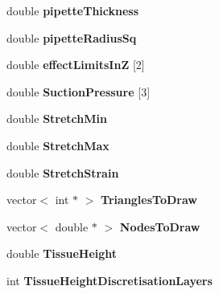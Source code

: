 \begin{DoxyCompactItemize}
\item 
\hypertarget{classSimulation_a330bde4b57359e57318c1105edde06c5}{}double {\bfseries pipette\+Thickness}\label{classSimulation_a330bde4b57359e57318c1105edde06c5}

\item 
\hypertarget{classSimulation_aee6fb6bd1bbed560039880b174a3a43c}{}double {\bfseries pipette\+Radius\+Sq}\label{classSimulation_aee6fb6bd1bbed560039880b174a3a43c}

\item 
\hypertarget{classSimulation_a70a94dce9bdc0a99a99cab0abe805185}{}double {\bfseries effect\+Limits\+In\+Z} \mbox{[}2\mbox{]}\label{classSimulation_a70a94dce9bdc0a99a99cab0abe805185}

\item 
\hypertarget{classSimulation_aa7b121f145af33dae88b463490aef709}{}double {\bfseries Suction\+Pressure} \mbox{[}3\mbox{]}\label{classSimulation_aa7b121f145af33dae88b463490aef709}

\item 
\hypertarget{classSimulation_a579d17e790d3ea2e470db00e3a732e0c}{}double {\bfseries Stretch\+Min}\label{classSimulation_a579d17e790d3ea2e470db00e3a732e0c}

\item 
\hypertarget{classSimulation_a53227db1a41449ba235979fdd052f42e}{}double {\bfseries Stretch\+Max}\label{classSimulation_a53227db1a41449ba235979fdd052f42e}

\item 
\hypertarget{classSimulation_a76aca0fc8a6de8550af15556d18e6dfb}{}double {\bfseries Stretch\+Strain}\label{classSimulation_a76aca0fc8a6de8550af15556d18e6dfb}

\item 
\hypertarget{classSimulation_aaffbf9ee13e071aa1cdc8e75a0d79774}{}vector$<$ int $\ast$ $>$ {\bfseries Triangles\+To\+Draw}\label{classSimulation_aaffbf9ee13e071aa1cdc8e75a0d79774}

\item 
\hypertarget{classSimulation_aa08434e5c71b265f87aab46be36438be}{}vector$<$ double $\ast$ $>$ {\bfseries Nodes\+To\+Draw}\label{classSimulation_aa08434e5c71b265f87aab46be36438be}

\item 
\hypertarget{classSimulation_adad1e5ce0657d347c8b46a4d1749caa3}{}double {\bfseries Tissue\+Height}\label{classSimulation_adad1e5ce0657d347c8b46a4d1749caa3}

\item 
\hypertarget{classSimulation_aafb36172155cdd675fb7d8cbe057c0ab}{}int {\bfseries Tissue\+Height\+Discretisation\+Layers}\label{classSimulation_aafb36172155cdd675fb7d8cbe057c0ab}


\end{DoxyCompactItemize}
